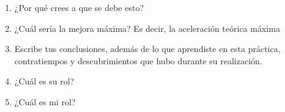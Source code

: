 \documentclass{article}
\begin{document}
\begin{enumerate}
    \item ¿Por qué crees a que se debe esto?
    
    \item ¿Cuál sería la mejora máxima? Es decir, la aceleración teórica máxima
    
    \item Escribe tus conclusiones, además de lo que aprendiste en esta práctica, contratiempos y descubrimientos que hubo durante su realización.
    
    \item ¿Cuál es su rol?
    
    \item ¿Cuál es mi rol?

    
\end{enumerate}
\end{document}
